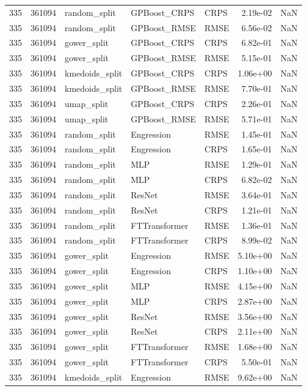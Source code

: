 \begin{tabular}{rrlllrr}
335 & 361094 & random\_split & GPBoost\_CRPS & CRPS & 2.19e-02 & NaN \\
335 & 361094 & random\_split & GPBoost\_RMSE & RMSE & 6.56e-02 & NaN \\
335 & 361094 & gower\_split & GPBoost\_CRPS & CRPS & 6.82e-01 & NaN \\
335 & 361094 & gower\_split & GPBoost\_RMSE & RMSE & 5.15e-01 & NaN \\
335 & 361094 & kmedoids\_split & GPBoost\_CRPS & CRPS & 1.06e+00 & NaN \\
335 & 361094 & kmedoids\_split & GPBoost\_RMSE & RMSE & 7.70e-01 & NaN \\
335 & 361094 & umap\_split & GPBoost\_CRPS & CRPS & 2.26e-01 & NaN \\
335 & 361094 & umap\_split & GPBoost\_RMSE & RMSE & 5.71e-01 & NaN \\
335 & 361094 & random\_split & Engression & RMSE & 1.45e-01 & NaN \\
335 & 361094 & random\_split & Engression & CRPS & 1.65e-01 & NaN \\
335 & 361094 & random\_split & MLP & RMSE & 1.29e-01 & NaN \\
335 & 361094 & random\_split & MLP & CRPS & 6.82e-02 & NaN \\
335 & 361094 & random\_split & ResNet & RMSE & 3.64e-01 & NaN \\
335 & 361094 & random\_split & ResNet & CRPS & 1.21e-01 & NaN \\
335 & 361094 & random\_split & FTTransformer & RMSE & 1.36e-01 & NaN \\
335 & 361094 & random\_split & FTTransformer & CRPS & 8.99e-02 & NaN \\
335 & 361094 & gower\_split & Engression & RMSE & 5.10e+00 & NaN \\
335 & 361094 & gower\_split & Engression & CRPS & 1.10e+00 & NaN \\
335 & 361094 & gower\_split & MLP & RMSE & 4.15e+00 & NaN \\
335 & 361094 & gower\_split & MLP & CRPS & 2.87e+00 & NaN \\
335 & 361094 & gower\_split & ResNet & RMSE & 3.56e+00 & NaN \\
335 & 361094 & gower\_split & ResNet & CRPS & 2.11e+00 & NaN \\
335 & 361094 & gower\_split & FTTransformer & RMSE & 1.68e+00 & NaN \\
335 & 361094 & gower\_split & FTTransformer & CRPS & 5.50e-01 & NaN \\
335 & 361094 & kmedoids\_split & Engression & RMSE & 9.62e+00 & NaN \\

\end{tabular}
